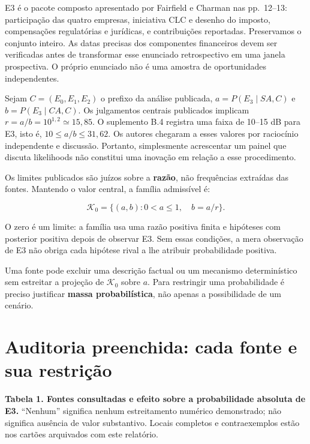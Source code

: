 \documentclass[
  brazilian,
  11pt,
  a4paper,
]{article}
\begin{document}
E3 é o pacote composto apresentado por Fairfield e Charman nas
pp.~12--13: participação das quatro empresas, iniciativa CLC e desenho
do imposto, compensações regulatórias e jurídicas, e contribuições
reportadas. Preservamos o conjunto inteiro. As datas precisas dos
componentes financeiros devem ser verificadas antes de transformar esse
enunciado retrospectivo em uma janela prospectiva. O próprio enunciado
não é uma amostra de oportunidades independentes.

Sejam \(C=(E_0,E_1,E_2)\) o prefixo da análise publicada,
\(a=P(E_3\mid SA,C)\) e \(b=P(E_3\mid CA,C)\). Os julgamentos centrais
publicados implicam \(r=a/b=10^{1,2}\simeq15,85\). O suplemento B.4
registra uma faixa de 10--15 dB para E3, isto é,
\(10\leq a/b\leq31,62\). Os autores chegaram a esses valores por
raciocínio independente e discussão. Portanto, simplesmente acrescentar
um painel que discuta likelihoods não constitui uma inovação em relação
a esse procedimento.

Os limites publicados são juízos sobre a \textbf{razão}, não frequências
extraídas das fontes. Mantendo o valor central, a família admissível é:

\[\mathcal K_0=\{(a,b):0<a\leq1,\quad b=a/r\}.\]

O zero é um limite: a família usa uma razão positiva finita e hipóteses
com posterior positiva depois de observar E3. Sem essas condições, a
mera observação de E3 não obriga cada hipótese rival a lhe atribuir
probabilidade positiva.

Uma fonte pode excluir uma descrição factual ou um mecanismo
determinístico sem estreitar a projeção de \(\mathcal K_0\) sobre \(a\).
Para restringir uma probabilidade é preciso justificar \textbf{massa
probabilística}, não apenas a possibilidade de um cenário.

\section{Auditoria preenchida: cada fonte e sua
restrição}\label{auditoria-preenchida-cada-fonte-e-sua-restriuxe7uxe3o}

\textbf{Tabela 1. Fontes consultadas e efeito sobre a probabilidade
absoluta de E3.} ``Nenhum'' significa nenhum estreitamento numérico
demonstrado; não significa ausência de valor substantivo. Locais
completos e contraexemplos estão nos cartões arquivados com este
relatório.
\end{document}
